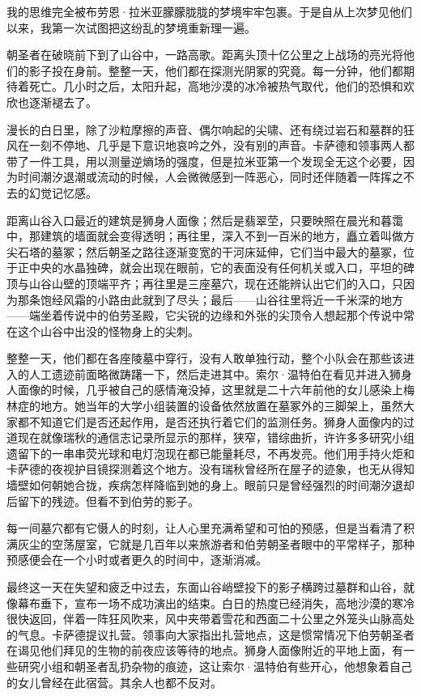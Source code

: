 \documentclass[AutoFakeBold=true]{book}
\begin{document}
\vspace*{1em}

我的思维完全被布劳恩·拉米亚朦朦胧胧的梦境牢牢包裹。于是自从上次梦见他们以来，我第一次试图把这纷乱的梦境重新理一遍。

朝圣者在破晓前下到了山谷中，一路高歌。距离头顶十亿公里之上战场的亮光将他们的影子投在身前。整整一天，他们都在探测光阴冢的究竟。每一分钟，他们都期待着死亡。几小时之后，太阳升起，高地沙漠的冰冷被热气取代，他们的恐惧和欢欣也逐渐褪去了。

漫长的白日里，除了沙粒摩擦的声音、偶尔响起的尖啸、还有绕过岩石和墓群的狂风在一刻不停地、几乎是下意识地哀吟之外，没有别的声音。卡萨德和领事两人都带了一件工具，用以测量逆熵场的强度，但是拉米亚第一个发现全无这个必要，因为时间潮汐退潮或流动的时候，人会微微感到一阵恶心，同时还伴随着一阵挥之不去的{\kaishu 幻觉记忆}感。

距离山谷入口最近的建筑是狮身人面像；然后是翡翠茔，只要映照在晨光和暮霭中，那建筑的墙面就会变得透明；再往里，深入不到一百米的地方，矗立着叫做方尖石塔的墓冢；然后朝圣之路往逐渐变宽的干河床延伸，它们当中最大的墓冢，位于正中央的水晶独碑，就会出现在眼前，它的表面没有任何机关或入口，平坦的碑顶与山谷山壁的顶端平齐；再往里是三座墓穴，现在还能辨认出它们的入口，只因为那条饱经风霜的小路由此就到了尽头；最后——山谷往里将近一千米深的地方——端坐着传说中的伯劳圣殿，它尖锐的边缘和外张的尖顶令人想起那个传说中常在这个山谷中出没的怪物身上的尖刺。

整整一天，他们都在各座陵墓中穿行，没有人敢单独行动，整个小队会在那些该进入的人工遗迹前面略微踌躇一下，然后走进其中。索尔·温特伯在看见并进入狮身人面像的时候，几乎被自己的感情淹没掉，这里就是二十六年前他的女儿感染上梅林症的地方。她当年的大学小组装置的设备依然放置在墓冢外的三脚架上，虽然大家都不知道它们是否还起作用，是否还执行着它们的监测任务。狮身人面像内的过道现在就像瑞秋的通信志记录所显示的那样，狭窄，错综曲折，许许多多研究小组遗留下的一串串荧光球和电灯泡现在都已能量耗尽，不再发亮。他们用手持火炬和卡萨德的夜视护目镜探测着这个地方。没有瑞秋曾经所在屋子的迹象，也无从得知墙壁如何朝她合拢，疾病怎样降临到她的身上。眼前只是曾经强烈的时间潮汐退却后留下的残迹。但看不到伯劳的影子。

每一间墓穴都有它慑人的时刻，让人心里充满希望和可怕的预感，但是当看清了积满灰尘的空荡屋室，它就是几百年以来旅游者和伯劳朝圣者眼中的平常样子，那种预感便会在一个小时或者更久的时间中，逐渐消减。

最终这一天在失望和疲乏中过去，东面山谷峭壁投下的影子横跨过墓群和山谷，就像幕布垂下，宣布一场不成功演出的结束。白日的热度已经消失，高地沙漠的寒冷很快返回，伴着一阵狂风吹来，风中夹带着雪花和西面二十公里之外笼头山脉高处的气息。卡萨德提议扎营。领事向大家指出扎营地点，这是惯常情况下伯劳朝圣者在谒见他们拜见的生物的前夜应该等待的地点。狮身人面像附近的平地上面，有一些研究小组和朝圣者乱扔杂物的痕迹，这让索尔·温特伯有些开心，他想象着自己的女儿曾经在此宿营。其余人也都不反对。
\end{document}
